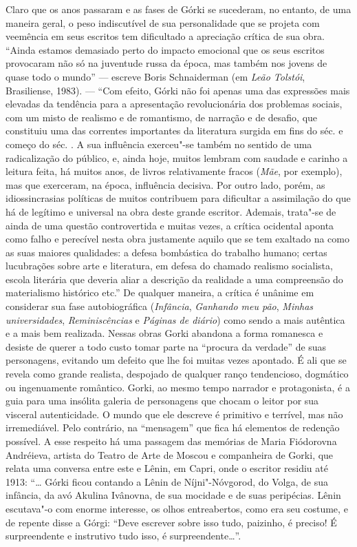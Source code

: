 Claro que os anos passaram e as fases de Górki se sucederam, no entanto,
de uma maneira geral, o peso indiscutível de sua personalidade que se
projeta com veemência em seus escritos tem dificultado a apreciação
crítica de sua obra. ``Ainda estamos demasiado perto do impacto
emocional que os seus escritos provocaram não só na juventude russa da
época, mas também nos jovens de quase todo o mundo'' --- escreve Boris
Schnaiderman (em \emph{Leão Tolstói}, Brasiliense, 1983). --- ``Com efeito, Górki não foi apenas uma das expressões
mais elevadas da tendência para a apresentação revolucionária dos
problemas sociais, com um misto de realismo e de romantismo, de narração
e de desafio, que constituiu uma das correntes importantes da literatura
surgida em fins do séc.  e começo do séc. . A sua influência
exerceu"-se também no sentido de uma radicalização do público, e, ainda
hoje, muitos lembram com saudade e carinho a leitura feita, há muitos
anos, de livros relativamente fracos (\emph{Mãe}, por exemplo), mas que
exerceram, na época, influência decisiva. Por outro lado, porém, as
idiossincrasias políticas de muitos contribuem para dificultar a
assimilação do que há de legítimo e universal na obra deste grande
escritor. Ademais, trata"-se de ainda de uma questão controvertida e
muitas vezes, a crítica ocidental aponta como falho e perecível nesta
obra justamente aquilo que se tem exaltado na  como as suas maiores
qualidades: a defesa bombástica do trabalho humano; certas lucubrações
sobre arte e literatura, em defesa do chamado realismo socialista,
escola literária que deveria aliar a descrição da realidade a uma
compreensão do materialismo histórico etc.'' De qualquer maneira, a
crítica é unânime em considerar sua fase autobiográfica
(\emph{Infância}, \emph{Ganhando meu pão}, \emph{Minhas universidades},
\emph{Reminiscências} e \emph{Páginas de diário}) como sendo a mais
autêntica e a mais bem realizada. Nessas obras Gorki abandona a forma
romanesca e desiste de querer a todo custo tomar parte na ``procura da
verdade'' de suas personagens, evitando um defeito que lhe foi muitas
vezes apontado. É ali que se revela como grande realista, despojado de
qualquer ranço tendencioso, dogmático ou ingenuamente romântico. Gorki,
ao mesmo tempo narrador e protagonista, é a guia para uma insólita
galeria de personagens que chocam o leitor por sua visceral
autenticidade. O mundo que ele descreve é primitivo e terrível, mas não
irremediável. Pelo contrário, na ``mensagem'' que fica há elementos de
redenção possível. A esse respeito há uma passagem das memórias de Maria
Fiódorovna Andréieva, artista do Teatro de Arte de Moscou e companheira
de Gorki, que relata uma conversa entre este e Lênin, em Capri, onde o
escritor residiu até 1913: ``\ldots{} Górki ficou contando a Lênin de
Níjni"-Nóvgorod, do Volga, de sua infância, da avó Akulina Ivânovna, de
sua mocidade e de suas peripécias. Lênin escutava"-o com enorme
interesse, os olhos entreabertos, como era seu costume, e de repente
disse a Górgi: ``Deve escrever sobre isso tudo, paizinho, é preciso! É
surpreendente e instrutivo tudo isso, é surpreendente\ldots{}''.

